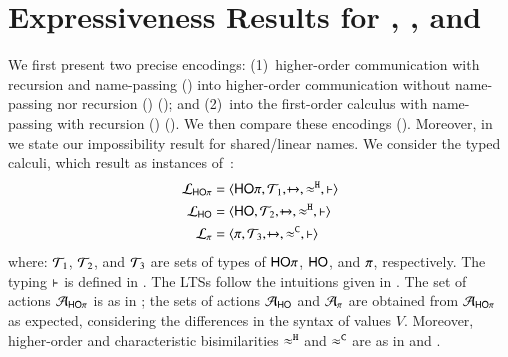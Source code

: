 \documentclass[preprint,11pt]{elsarticle}
\begin{document}
{%

\section{Expressiveness Results for \HOp, \HO, and \sessp}
\label{sec:positive}
%
 We first present two %
 precise encodings: 
(1)~higher-order communication with recursion and name-passing   (\HOp) into 
higher-order communication without name-passing nor recursion (\HO) (); and 
(2)~\HOp into the first-order calculus with name-passing  
with recursion (\sessp) ().
We then compare these  encodings (). 
Moreover, in  we state our impossibility result for shared/linear names.
We consider the typed calculi, which result as instances of~:
\begin{align*}
	\mathcal{L}_{\mathsf{HO}\pi} & =\langle \mathsf{HO}\pi, {\cal{T}}_1, \xmapsto{~}, \approx^\mathtt{H}, \vdash \rangle
	\\
	\mathcal{L}_{\mathsf{HO}} & =\langle \mathsf{HO}, {\cal{T}}_2, \xmapsto{~}, \approx^\mathtt{H}, \vdash \rangle
	\\
	\mathcal{L}_{\pi} & =\langle \pi, {\cal{T}}_3, \xmapsto{~}, \approx^\mathtt{C}, \vdash \rangle
\end{align*}
where: 
${\cal{T}}_1$, ${\cal{T}}_2$, 
and ${\cal{T}}_3$
are sets of types of $\mathsf{HO}\pi$, $\mathsf{HO}$, and $\pi$, respectively. 
The typing $\vdash$ is defined in 
.
The LTSs follow the intuitions given in .
The set of actions $\mathcal{A}_{\mathsf{HO}\pi}$ is as in ; the sets of actions $\mathcal{A}_\mathsf{HO}$ and $\mathcal{A}_\pi$ 
are obtained from $\mathcal{A}_{\mathsf{HO}\pi}$ 
as expected, considering the differences in the syntax of values $V$.
Moreover, higher-order and characteristic bisimilarities
$\approx^\mathtt{H}$ 
and 
$\approx^\mathtt{C}$ are 
as in  and .

}
\end{document}
